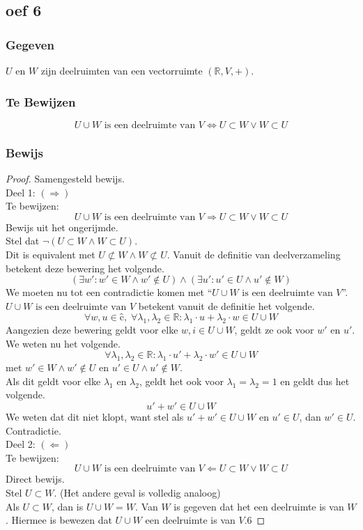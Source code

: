 \documentclass[lineaire_algebra_oplossingen.tex]{subfiles}
\begin{document}
\subsection*{oef 6}
\subsubsection*{Gegeven}
$U$ en $W$ zijn deelruimten van een vectorruimte $(\mathbb{R},V,+)$.
\subsubsection*{Te Bewijzen}
\[
U \cup W \text{ is een deelruimte van }V \Leftrightarrow U \subset W \vee W \subset U
\]
\subsubsection*{Bewijs}
\begin{proof} Samengesteld bewijs.
\\Deel 1: $(\Rightarrow)$
\\ Te bewijzen:
\[
U \cup W \text{ is een deelruimte van }V \Rightarrow U \subset W \vee W \subset U
\]
Bewijs uit het ongerijmde.
\\Stel dat $\neg(U \subset W \wedge W \subset U)$.
\\Dit is equivalent met $U \not\subset W \wedge W \not\subset U$.
Vanuit de definitie van deelverzameling betekent deze bewering het volgende.
\[
(\exists w': w' \in W \wedge w' \not\in U) \wedge (\exists u': u' \in U \wedge u' \not\in W) 
\]
We moeten nu tot een contradictie komen met ``$U\cup W \text{ is een deelruimte van }V$''.
$U\cup W \text{ is een deelruimte van }V$ betekent vanuit de definitie het volgende.
\[
\forall w, u \in ĉ,\; \forall \lambda_1 , \lambda_2 \in \mathbb{R}: \lambda_1\cdot u + \lambda_2\cdot w \in U\cup W
\]
Aangezien deze bewering geldt voor elke $w,i \in U\cup W$, geldt ze ook voor $w'$ en $u'$.
We weten nu het volgende.
\[
\forall \lambda_1 , \lambda_2 \in \mathbb{R}: \lambda_1\cdot u' + \lambda_2\cdot w' \in U\cup W
\]
met $w' \in W \wedge w' \not\in U$ en $u' \in U \wedge u' \not\in W$.\\
Als dit geldt voor elke $\lambda_1$ en $\lambda_2$, geldt het ook voor $\lambda_1= \lambda_2 = 1$ en geldt dus het volgende.
\[
u' + w' \in U \cup W
\]
We weten dat dit niet klopt, want stel als $u' + w' \in U \cup W$ en $u' \in U$, dan $w' \in U$. Contradictie.
\\Deel 2: $(\Leftarrow)$
\\ Te bewijzen:
\[
U \cup W \text{ is een deelruimte van }V \Leftarrow U \subset W \vee W \subset U
\]
Direct bewijs.\\
Stel $U \subset W$. (Het andere geval is volledig analoog)\\
Als $U \subset W$, dan is $U\cup W = W$. Van $W$ is gegeven dat het een deelruimte is van $W$. Hiermee is bewezen dat $U\cup W$ een deelruimte is van $V$.6
\end{proof}
\end{document}
